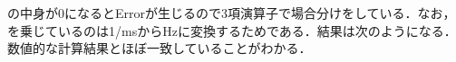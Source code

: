 の中身が0になるとErrorが生じるので3項演算子で場合分けをしている．なお，を乗じているのは1/msからHzに変換するためである．結果は次のようになる．数値的な計算結果とほぼ一致していることがわかる．